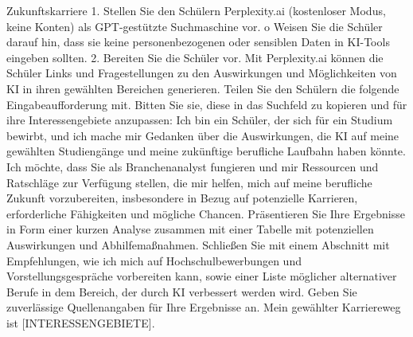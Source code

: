 \documentclass[
  ngerman,
  letterpaper,
  DIV=11]{scrreprt}
\newenvironment{Shaded}{\begin{snugshade}}{\end{snugshade}}
\newcommand{\CommentTok}[1]{\textcolor[rgb]{0.37,0.37,0.37}{#1}}
\newcommand{\NormalTok}[1]{\textcolor[rgb]{0.00,0.23,0.31}{#1}}
\newcommand{\OtherTok}[1]{\textcolor[rgb]{0.00,0.23,0.31}{#1}}
\newcommand{\SpecialStringTok}[1]{\textcolor[rgb]{0.13,0.47,0.30}{#1}}
\begin{document}
\begin{tcolorbox}
\begin{Shaded}
\begin{Highlighting}[]
    
\NormalTok{Zukunftskarriere}
\SpecialStringTok{1.  }\NormalTok{Stellen Sie den Schülern Perplexity.ai (kostenloser Modus, keine Konten) als GPT{-}gestützte Suchmaschine vor.}
\NormalTok{o   Weisen Sie die Schüler darauf hin, dass sie keine personenbezogenen oder sensiblen Daten in KI{-}Tools eingeben sollten.}
\SpecialStringTok{2.  }\NormalTok{Bereiten Sie die Schüler vor. Mit Perplexity.ai können die Schüler Links und Fragestellungen zu den Auswirkungen und Möglichkeiten von KI in ihren gewählten Bereichen generieren.}
\NormalTok{Teilen Sie den Schülern die folgende Eingabeaufforderung mit. Bitten Sie sie, diese in das Suchfeld zu kopieren und für ihre Interessengebiete anzupassen:}
\NormalTok{Ich bin ein Schüler, der sich für ein Studium bewirbt, und ich mache mir Gedanken über die Auswirkungen, die KI auf meine gewählten Studiengänge und meine zukünftige berufliche Laufbahn haben könnte. Ich möchte, dass Sie als Branchenanalyst fungieren und mir Ressourcen und Ratschläge zur Verfügung stellen, die mir helfen, mich auf meine berufliche Zukunft vorzubereiten, insbesondere in Bezug auf potenzielle Karrieren, erforderliche Fähigkeiten und mögliche Chancen. Präsentieren Sie Ihre Ergebnisse in Form einer kurzen Analyse zusammen mit einer Tabelle mit potenziellen Auswirkungen und Abhilfemaßnahmen. Schließen Sie mit einem Abschnitt mit Empfehlungen, wie ich mich auf Hochschulbewerbungen und Vorstellungsgespräche vorbereiten kann, sowie einer Liste möglicher alternativer Berufe in dem Bereich, der durch KI verbessert werden wird. Geben Sie zuverlässige Quellenangaben für Ihre Ergebnisse an. Mein gewählter Karriereweg ist }\CommentTok{[}\OtherTok{INTERESSENGEBIETE}\CommentTok{]}\NormalTok{.}


\end{Highlighting}
\end{Shaded}
\end{tcolorbox}
\end{document}
